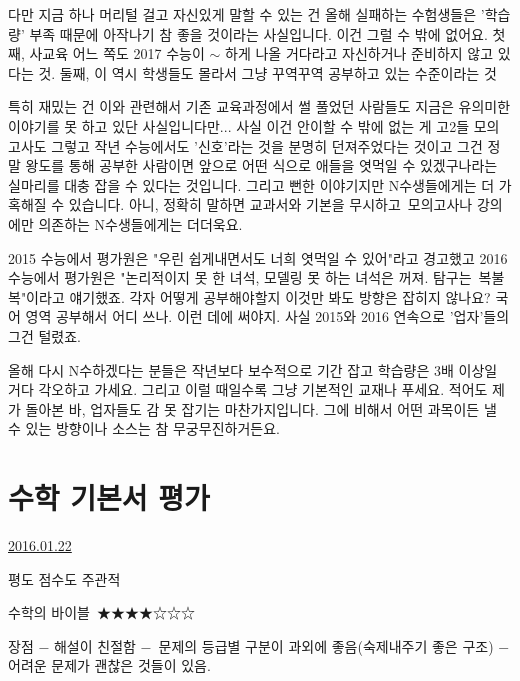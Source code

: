 다만 지금 하나 머리털 걸고 자신있게 말할 수 있는 건
올해 실패하는 수험생들은 '학습량' 부족 때문에 아작나기 참 좋을 것이라는 사실입니다.
이건 그럴 수 밖에 없어요.
첫째, 사교육 어느 쪽도 2017 수능이 $\sim$ 하게 나올 거다라고 자신하거나 준비하지 않고 있다는 것.
둘째, 이 역시 학생들도 몰라서 그냥 꾸역꾸역 공부하고 있는 수준이라는 것
\vspace{5mm}

특히 재밌는 건 이와 관련해서 기존 교육과정에서 썰 풀었던 사람들도 지금은 유의미한 이야기를 못 하고 있단 사실입니다만...
사실 이건 안이할 수 밖에 없는 게 고2들 모의고사도 그렇고 작년 수능에서도 '신호'라는 것을 분명히 던져주었다는 것이고
그건 정말 왕도를 통해 공부한 사람이면 앞으로 어떤 식으로 애들을 엿먹일 수 있겠구나라는 실마리를 대충 잡을 수 있다는 것입니다.
그리고 뻔한 이야기지만 N수생들에게는 더 가혹해질 수 있습니다.
아니, 정확히 말하면 교과서와 기본을 무시하고 모의고사나 강의에만 의존하는 N수생들에게는 더더욱요.
\vspace{5mm}

2015 수능에서 평가원은 "우린 쉽게내면서도 너희 엿먹일 수 있어"라고 경고했고
2016 수능에서 평가원은 "논리적이지 못 한 녀석, 모델링 못 하는 녀석은 꺼져. 탐구는 복불복"이라고 얘기했죠.
각자 어떻게 공부해야할지 이것만 봐도 방향은 잡히지 않나요? 국어 영역 공부해서 어디 쓰나. 이런 데에 써야지.
사실 2015와 2016 연속으로 '업자'들의 그건 털렸죠.
\vspace{5mm}

올해 다시 N수하겠다는 분들은 작년보다 보수적으로 기간 잡고 학습량은 3배 이상일 거다 각오하고 가세요.
그리고 이럴 때일수록 그냥 기본적인 교재나 푸세요. 적어도 제가 돌아본 바, 업자들도 감 못 잡기는 마찬가지입니다.
그에 비해서 어떤 과목이든 낼 수 있는 방향이나 소스는 참 무궁무진하거든요.
\vspace{5mm}






\section{수학 기본서 평가}
\href{https://www.kockoc.com/Apoc/604542}{2016.01.22}

\vspace{5mm}

평도 점수도 주관적
\vspace{5mm}

수학의 바이블 ★★★★☆☆☆
\vspace{5mm}

장점
$-$ 해설이 친절함
$-$ 문제의 등급별 구분이 과외에 좋음(숙제내주기 좋은 구조)
$-$ 어려운 문제가 괜찮은 것들이 있음.
\vspace{5mm}

